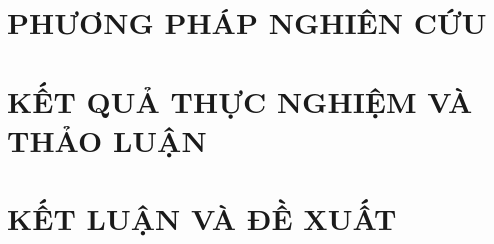 \documentclass[a4paper,12pt,oneside]{report}
\begin{document}
\chapter{ PHƯƠNG PHÁP NGHIÊN CỨU}


\chapter{ KẾT QUẢ THỰC NGHIỆM VÀ THẢO LUẬN}


\chapter{ KẾT LUẬN VÀ ĐỀ XUẤT}






\end{document}
